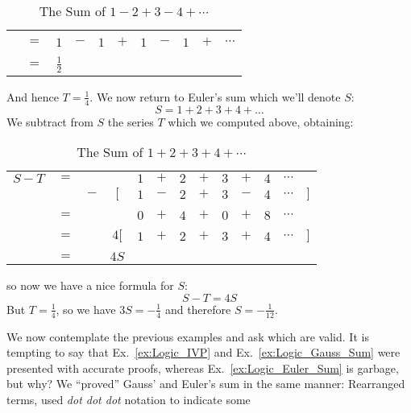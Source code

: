 \begin{example}
\begin{table}[H]
\begin{tabular}{ccccccccccc}
                \hline\\
                    &$=$&$1$&$-$&$1$&$+$&$1$&$-$&$1$&$+$&$\cdots$\\
                \hline\\
                &$=$&$\frac{1}{2}$
            \end{tabular}
            \caption{The Sum of $1-2+3-4+\cdots$}
        \end{table}
        And hence $T=\frac{1}{4}$. We now return to Euler's sum which we'll
        denote $S$:
        \begin{equation}
            S=1+2+3+4+\dots
        \end{equation}
        We subtract from $S$ the series $T$ which we computed above, obtaining:
        \begin{table}[H]
            \centering
            \captionsetup{type=table}
            \begin{tabular}{ccccccccccccc}
                $S-T$&$=$&&       &$1$&$+$&$2$&$+$&$3$&$+$&$4$&$\cdots$\\
                     &&$-$&$\Big[$&$1$&$-$&$2$&$+$&$3$&$-$&$4$&$\cdots$&$\Big]$
                \\[1ex]
                \hline\\
                     &$=$&&&$0$&$+$&$4$&$+$&$0$&$+$&$8$&$\cdots$\\[1ex]
                \hline\\
                &$=$&&$4\Big[$&$1$&$+$&$2$&$+$&$3$&$+$&$4$&$\cdots$&$\Big]$
                    \\[1ex]
                \hline\\
                &$=$&&$4S$
            \end{tabular}
            \caption{The Sum of $1+2+3+4+\cdots$}
        \end{table}
        so now we have a nice formula for $S$:
        \begin{equation}
            S-T=4S
        \end{equation}
        But $T=\frac{1}{4}$, so we have $3S=\minus\frac{1}{4}$ and therefore
        $S=\minus\frac{1}{12}$.
    \end{example}
    We now contemplate the previous examples and ask which are valid. It is
    tempting to say that Ex.~\ref{ex:Logic_IVP} and Ex.~\ref{ex:Logic_Gauss_Sum}
    were presented with accurate proofs, whereas Ex.~\ref{ex:Logic_Euler_Sum} is
    garbage, but why? We ``proved'' Gauss' and Euler's sum in the same manner:
    Rearranged terms, used \textit{dot dot dot} notation to indicate some
